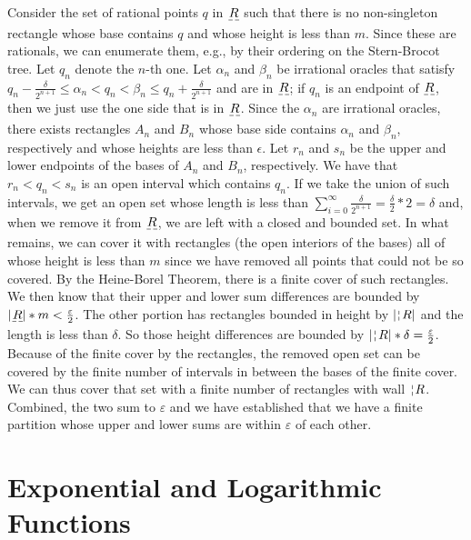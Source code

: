 \documentclass[12pt]{article}
\begin{document}
Consider the set of rational points $q$ in $\base{R}$ such that there is no non-singleton rectangle whose base contains $q$ and whose height is less than $m$. Since these are rationals, we can enumerate them, e.g.,  by their ordering on the Stern-Brocot tree. Let $q_n$ denote the $n$-th one. Let $\alpha_n$ and $\beta_n$ be irrational oracles that satisfy $q_n - \frac{\delta}{2^{n+1}} \leq \alpha_n < q_n < \beta_n \leq q_n + \frac{\delta}{2^{n+1}}$ and are in $\base{R}$; if $q_n$ is an endpoint of $\base{R}$, then we just use the one side that is in $\base{R}$. Since the $\alpha_n$ are irrational oracles, there exists rectangles $A_n$ and $B_n$ whose base side contains $\alpha_n$ and $\beta_n$, respectively and whose heights are less than $\epsilon$. Let $r_n$ and $s_n$ be the upper and lower endpoints of the bases of $A_n$ and $B_n$, respectively. We have that $r_n < q_n < s_n$ is an open interval which contains $q_n$. If we take the union of such intervals, we get an open set whose length is less than $\sum_{i=0}^\infty \frac{\delta}{2^{n+1}} = \frac{\delta}{2} * 2 = \delta$ and, when we remove it from $\base{R}$, we are left with a closed and bounded set. In what remains, we can cover it with rectangles (the open interiors of the bases) all of whose height is less than $m$ since we have removed all points that could not be so covered. By the Heine-Borel Theorem, there is a finite cover of such rectangles. We then know that their upper and lower sum differences are bounded by $|\base{R}|*m < \frac{\varepsilon}{2}$. The other portion has rectangles bounded in height by $|\wall{R}|$ and the length is less than $\delta$. So those height differences are bounded by $|\wall{R}|*\delta = \frac{\varepsilon}{2}$. Because of the finite cover by the rectangles, the removed open set can be covered by the finite number of intervals in between the bases of the finite cover. We can thus cover that set with a finite number of rectangles with wall $\wall{R}$. Combined, the two sum to $\varepsilon$ and we have established that we have a finite partition whose upper and lower sums are within $\varepsilon$ of each other. 





\medskip

\appendix

\section{Exponential and Logarithmic Functions}\label{app:e}
\end{document}
